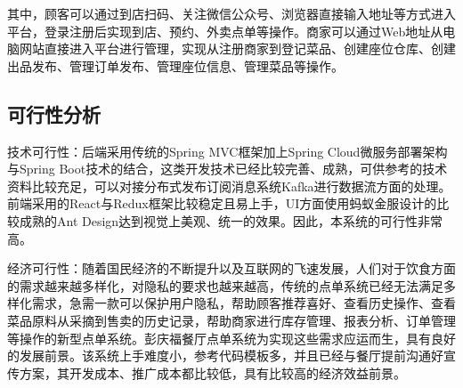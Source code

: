 其中，顾客可以通过到店扫码、关注微信公众号、浏览器直接输入地址等方式进入平台，登录注册后实现到店、预约、外卖点单等操作。商家可以通过Web地址从电脑网站直接进入平台进行管理，实现从注册商家到登记菜品、创建座位仓库、创建出品发布、管理订单发布、管理座位信息、管理菜品等操作。\\

\subsection{可行性分析}
技术可行性：后端采用传统的Spring MVC框架加上Spring Cloud微服务部署架构与Spring Boot技术的结合，这类开发技术已经比较完善、成熟，可供参考的技术资料比较充足，可以对接分布式发布订阅消息系统Kafka进行数据流方面的处理。前端采用的React与Redux框架比较稳定且易上手，UI方面使用蚂蚁金服设计的比较成熟的Ant Design达到视觉上美观、统一的效果。因此，本系统的可行性非常高。

经济可行性：随着国民经济的不断提升以及互联网的飞速发展，人们对于饮食方面的需求越来越多样化，对隐私的要求也越来越高，传统的点单系统已经无法满足多样化需求，急需一款可以保护用户隐私，帮助顾客推荐喜好、查看历史操作、查看菜品原料从采摘到售卖的历史记录，帮助商家进行库存管理、报表分析、订单管理等操作的新型点单系统。彭庆福餐厅点单系统为实现这些需求应运而生，具有良好的发展前景。该系统上手难度小，参考代码模板多，并且已经与餐厅提前沟通好宣传方案，其开发成本、推广成本都比较低，具有比较高的经济效益前景。


